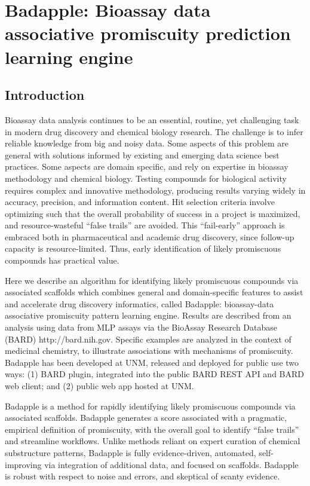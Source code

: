\chapter{Badapple: Bioassay data associative promiscuity prediction learning engine}

\section{Introduction}

Bioassay data analysis continues to be an essential, routine, yet challenging task in modern drug discovery and chemical biology research. The challenge is to infer reliable knowledge from big and noisy data. Some aspects of this problem are general with solutions informed by existing and emerging data science best practices. Some aspects are domain specific, and rely on expertise in bioassay methodology and chemical biology. Testing compounds for biological activity requires complex and innovative methodology, producing results varying widely in accuracy, precision, and information content. Hit selection criteria involve optimizing such that the overall probability of success in a project is maximized, and resource-wasteful “false trails” are avoided. This “fail-early” approach is embraced both in pharmaceutical and academic drug discovery, since follow-up capacity is resource-limited. Thus, early identification of likely promiscuous compounds has practical value.

Here we describe an algorithm for identifying likely promiscuous compounds via associated scaffolds which combines general and domain-specific features to assist and accelerate drug discovery informatics, called Badapple: bioassay-data associative promiscuity pattern learning engine. Results are described from an analysis using data from MLP assays via the BioAssay Research Database (BARD) http://bard.nih.gov. Specific examples are analyzed in the context of medicinal chemistry, to illustrate associations with mechanisms of promiscuity. Badapple\cite{Yang2016-gn} has been developed at UNM, released and deployed for public use two ways: (1) BARD plugin, integrated into the public BARD REST API and BARD web client; and (2) public web app hosted at UNM.

Badapple is a method for rapidly identifying likely promiscuous compounds via associated scaffolds. Badapple generates a score associated with a pragmatic, empirical definition of promiscuity, with the overall goal to identify “false trails” and streamline workflows. Unlike methods reliant on expert curation of chemical substructure patterns, Badapple is fully evidence-driven, automated, self-improving via integration of additional data, and focused on scaffolds. Badapple is robust with respect to noise and errors, and skeptical of scanty evidence.

